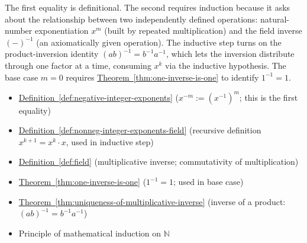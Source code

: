 \begin{remark*}
The first equality is definitional.  The second requires induction because
it asks about the relationship between two independently defined operations:
natural-number exponentiation $x^m$ (built by repeated multiplication) and
the field inverse $(-)^{-1}$ (an axiomatically given operation).  The inductive
step turns on the product-inversion identity $(ab)^{-1} = b^{-1}a^{-1}$, which
lets the inversion distribute through one factor at a time, consuming $x^k$
via the inductive hypothesis.  The base case $m=0$ requires
\hyperref[thm:one-inverse-is-one]{Theorem~\ref*{thm:one-inverse-is-one}} to
identify $1^{-1} = 1$.
\end{remark*}

\begin{dependencies}
\begin{itemize}
  \item \hyperref[def:negative-integer-exponents]{Definition~\ref*{def:negative-integer-exponents}}
        \textnormal{($x^{-m} := (x^{-1})^m$; this is the first equality)}
  \item \hyperref[def:nonneg-integer-exponents-field]{Definition~\ref*{def:nonneg-integer-exponents-field}}
        \textnormal{(recursive definition $x^{k+1} = x^k\cdot x$, used in inductive step)}
  \item \hyperref[def:field]{Definition~\ref*{def:field}}
        \textnormal{(multiplicative inverse; commutativity of multiplication)}
  \item \hyperref[thm:one-inverse-is-one]{Theorem~\ref*{thm:one-inverse-is-one}}
        \textnormal{($1^{-1} = 1$; used in base case)}
  \item \hyperref[thm:uniqueness-of-multiplicative-inverse]{Theorem~\ref*{thm:uniqueness-of-multiplicative-inverse}}
        \textnormal{(inverse of a product: $(ab)^{-1} = b^{-1}a^{-1}$)}
  \item Principle of mathematical induction on $\mathbb{N}$
\end{itemize}
\end{dependencies}
